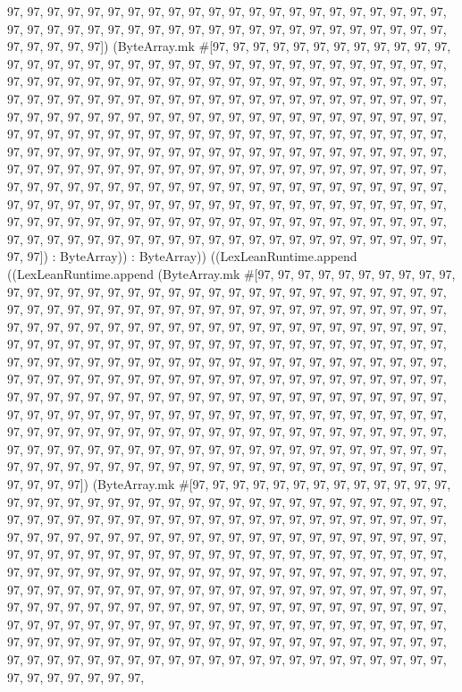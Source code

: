 \documentclass[11pt]{article}
\begin{document}
97, 97, 97, 97, 97, 97, 97, 97, 97, 97, 97, 97, 97, 97, 97, 97, 97, 97, 97, 97, 97, 97, 97, 97, 97, 97, 97, 97, 97, 97, 97, 97, 97, 97, 97, 97, 97, 97, 97, 97, 97, 97, 97, 97, 97, 97, 97, 97, 97]) (ByteArray.mk \#[97, 97, 97, 97, 97, 97, 97, 97, 97, 97, 97, 97, 97, 97, 97, 97, 97, 97, 97, 97, 97, 97, 97, 97, 97, 97, 97, 97, 97, 97, 97, 97, 97, 97, 97, 97, 97, 97, 97, 97, 97, 97, 97, 97, 97, 97, 97, 97, 97, 97, 97, 97, 97, 97, 97, 97, 97, 97, 97, 97, 97, 97, 97, 97, 97, 97, 97, 97, 97, 97, 97, 97, 97, 97, 97, 97, 97, 97, 97, 97, 97, 97, 97, 97, 97, 97, 97, 97, 97, 97, 97, 97, 97, 97, 97, 97, 97, 97, 97, 97, 97, 97, 97, 97, 97, 97, 97, 97, 97, 97, 97, 97, 97, 97, 97, 97, 97, 97, 97, 97, 97, 97, 97, 97, 97, 97, 97, 97, 97, 97, 97, 97, 97, 97, 97, 97, 97, 97, 97, 97, 97, 97, 97, 97, 97, 97, 97, 97, 97, 97, 97, 97, 97, 97, 97, 97, 97, 97, 97, 97, 97, 97, 97, 97, 97, 97, 97, 97, 97, 97, 97, 97, 97, 97, 97, 97, 97, 97, 97, 97, 97, 97, 97, 97, 97, 97, 97, 97, 97, 97, 97, 97, 97, 97, 97, 97, 97, 97, 97, 97, 97, 97, 97, 97, 97, 97, 97, 97, 97, 97, 97, 97, 97, 97, 97, 97, 97, 97, 97, 97, 97, 97, 97, 97, 97, 97, 97, 97, 97, 97, 97, 97, 97, 97, 97, 97, 97, 97, 97, 97, 97, 97, 97, 97, 97, 97, 97, 97, 97, 97, 97, 97, 97, 97, 97, 97]) : ByteArray)) : ByteArray)) ((LexLeanRuntime.append ((LexLeanRuntime.append (ByteArray.mk \#[97, 97, 97, 97, 97, 97, 97, 97, 97, 97, 97, 97, 97, 97, 97, 97, 97, 97, 97, 97, 97, 97, 97, 97, 97, 97, 97, 97, 97, 97, 97, 97, 97, 97, 97, 97, 97, 97, 97, 97, 97, 97, 97, 97, 97, 97, 97, 97, 97, 97, 97, 97, 97, 97, 97, 97, 97, 97, 97, 97, 97, 97, 97, 97, 97, 97, 97, 97, 97, 97, 97, 97, 97, 97, 97, 97, 97, 97, 97, 97, 97, 97, 97, 97, 97, 97, 97, 97, 97, 97, 97, 97, 97, 97, 97, 97, 97, 97, 97, 97, 97, 97, 97, 97, 97, 97, 97, 97, 97, 97, 97, 97, 97, 97, 97, 97, 97, 97, 97, 97, 97, 97, 97, 97, 97, 97, 97, 97, 97, 97, 97, 97, 97, 97, 97, 97, 97, 97, 97, 97, 97, 97, 97, 97, 97, 97, 97, 97, 97, 97, 97, 97, 97, 97, 97, 97, 97, 97, 97, 97, 97, 97, 97, 97, 97, 97, 97, 97, 97, 97, 97, 97, 97, 97, 97, 97, 97, 97, 97, 97, 97, 97, 97, 97, 97, 97, 97, 97, 97, 97, 97, 97, 97, 97, 97, 97, 97, 97, 97, 97, 97, 97, 97, 97, 97, 97, 97, 97, 97, 97, 97, 97, 97, 97, 97, 97, 97, 97, 97, 97, 97, 97, 97, 97, 97, 97, 97, 97, 97, 97, 97, 97, 97, 97, 97, 97, 97, 97, 97, 97, 97, 97, 97, 97, 97, 97, 97, 97, 97, 97, 97, 97, 97, 97, 97, 97]) (ByteArray.mk \#[97, 97, 97, 97, 97, 97, 97, 97, 97, 97, 97, 97, 97, 97, 97, 97, 97, 97, 97, 97, 97, 97, 97, 97, 97, 97, 97, 97, 97, 97, 97, 97, 97, 97, 97, 97, 97, 97, 97, 97, 97, 97, 97, 97, 97, 97, 97, 97, 97, 97, 97, 97, 97, 97, 97, 97, 97, 97, 97, 97, 97, 97, 97, 97, 97, 97, 97, 97, 97, 97, 97, 97, 97, 97, 97, 97, 97, 97, 97, 97, 97, 97, 97, 97, 97, 97, 97, 97, 97, 97, 97, 97, 97, 97, 97, 97, 97, 97, 97, 97, 97, 97, 97, 97, 97, 97, 97, 97, 97, 97, 97, 97, 97, 97, 97, 97, 97, 97, 97, 97, 97, 97, 97, 97, 97, 97, 97, 97, 97, 97, 97, 97, 97, 97, 97, 97, 97, 97, 97, 97, 97, 97, 97, 97, 97, 97, 97, 97, 97, 97, 97, 97, 97, 97, 97, 97, 97, 97, 97, 97, 97, 97, 97, 97, 97, 97, 97, 97, 97, 97, 97, 97, 97, 97, 97, 97, 97, 97, 97, 97, 97, 97, 97, 97, 97, 97, 97, 97, 97, 97, 97, 97, 97, 97, 97, 97, 97, 97, 97, 97, 97, 97, 97, 97, 97, 97, 97, 97, 97, 97, 97, 97, 97, 97, 97, 97, 97, 97, 97, 97, 97, 97, 97, 97, 97, 97, 97, 97, 97, 97, 97, 97, 97, 97, 97, 97, 97, 97, 97, 97, 
\end{document}
